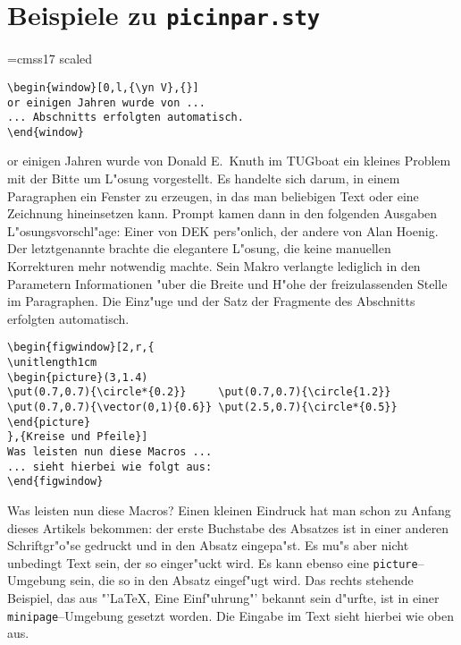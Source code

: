 \documentclass[german,picinpar]{article}
\begin{document}
\section*{Beispiele zu {\tt picinpar.sty}}
\font\yn=cmss17 scaled  %
\begin{verbatim}
\begin{window}[0,l,{\yn V},{}]
or einigen Jahren wurde von ...
... Abschnitts erfolgten automatisch.
\end{window}
\end{verbatim}

\begin{window}[0,l,{\yn V},{}]
or einigen Jahren wurde von Donald E.~Knuth im TUGboat ein kleines
Problem mit der Bitte um L"osung vorgestellt. Es handelte sich darum,
in einem Paragraphen ein Fenster zu erzeugen, in das man beliebigen Text
oder eine Zeichnung hineinsetzen kann. Prompt kamen dann in den folgenden
Ausgaben L"osungsvorschl"age: Einer von DEK pers"onlich, der andere von
Alan Hoenig. Der letztgenannte brachte die elegantere L"osung, die keine
manuellen Korrekturen mehr notwendig machte. Sein Makro verlangte lediglich
in den Parametern Informationen "uber die Breite und H"ohe der
freizulassenden Stelle im Paragraphen. Die Einz"uge und der Satz der
Fragmente des Abschnitts erfolgten automatisch.
\end{window}

\begin{verbatim}
\begin{figwindow}[2,r,{
\unitlength1cm
\begin{picture}(3,1.4)
\put(0.7,0.7){\circle*{0.2}}     \put(0.7,0.7){\circle{1.2}}
\put(0.7,0.7){\vector(0,1){0.6}} \put(2.5,0.7){\circle*{0.5}}
\end{picture}
},{Kreise und Pfeile}]
Was leisten nun diese Macros ...
... sieht hierbei wie folgt aus:
\end{figwindow}
\end{verbatim}

\begin{figwindow}
Was leisten nun diese Macros? Einen kleinen Eindruck hat man schon
zu Anfang dieses Artikels bekommen: der erste Buchstabe des Absatzes
ist in einer anderen Schriftgr"o"se gedruckt und in den Absatz eingepa"st.
Es mu"s aber nicht unbedingt Text sein, der so einger"uckt wird. Es kann
ebenso eine \verb?picture?--Umgebung sein, die so in den Absatz eingef"ugt
wird. Das rechts stehende Beispiel, das aus "'\LaTeX , Eine Einf"uhrung"'
bekannt sein d"urfte, ist in einer \verb?minipage?--Umgebung gesetzt
worden. Die Eingabe im Text sieht hierbei wie oben aus.
\end{figwindow}
\end{document}
